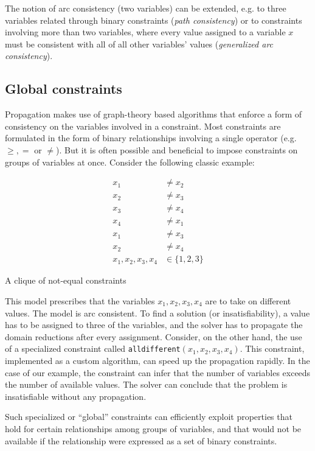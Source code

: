 \documentclass[13pt, letterpaper, oneside]{book}
\begin{document}
The notion of arc consistency (two variables) can be extended, e.g. to three
variables related through binary constraints (\textit{path consistency}) or
to constraints involving more than two variables, where every value assigned to
a variable $x$ must be consistent with all of all other variables' values
(\textit{generalized arc consistency}).

\subsection{Global constraints}
Propagation makes use of graph-theory based algorithms that enforce a form of
consistency on the variables involved in a constraint. Most constraints are
formulated in the form of binary relationships involving a single operator (e.g.
$\geq, =$ or $\neq$). But it is often possible and beneficial to impose
constraints on groups of variables at once. Consider the following classic
example:
\begin{model}[h!]
\begin{align}
x_1 &\neq x_2\\
x_2 &\neq x_3\\
x_3 &\neq x_4\\
x_4 &\neq x_1\\
x_1 &\neq x_3\\
x_2 &\neq x_4\\
x_1, x_2, x_3, x_4 &\in \{1, 2, 3\}
\end{align}
\caption{A clique of not-equal constraints}
\label{mod:cpalldiff}
\end{model}
This model prescribes that the variables $x_1, x_2, x_3, x_4$ are to take on
different values. The model is arc consistent. To find a solution (or
insatisfiability), a value has to be assigned to three of the variables, and the
solver has to propagate the domain reductions after every assignment. Consider,
on the other hand, the use of a specialized constraint called
\texttt{alldifferent}$(x_1, x_2, x_3, x_4)$. This constraint, implemented as a
custom algorithm, can speed up the propagation rapidly. In the case of our
example, the constraint can infer that the number of variables exceeds the
number of available values. The solver can conclude that the problem is
insatisfiable without any propagation.

Such specialized or ``global'' constraints can efficiently exploit properties
that hold for certain relationships among groups of variables, and that would
not be available if the relationship were expressed as a set of binary
constraints.
 
\end{document}
